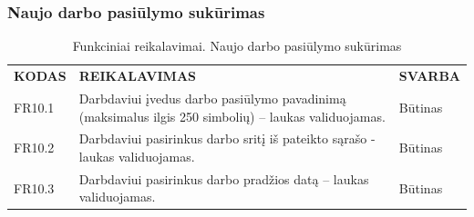 \documentclass{VUMIFPSkursinis}
\begin{document}
\subsubsection{Naujo darbo pasiūlymo sukūrimas}
\begin{table}[H]
\caption{Funkciniai reikalavimai. Naujo darbo pasiūlymo sukūrimas}
\centering
\normalsize
\begin{tabular}{|p{2cm}|p{10cm}|p{3cm}|}
\hline
\rowcolor{gray!30}
\multicolumn{3}{|l|}{\textbf{10. Naujo darbo pasiūlymo sukūrimas}} \\ \hline
\textbf{KODAS}& \multicolumn{1}{m{10cm}|}{\textbf{REIKALAVIMAS}} & \textbf{SVARBA} \\ \hline
FR10.1 & \multicolumn{1}{m{10cm}|}{Darbdaviui įvedus darbo pasiūlymo pavadinimą (maksimalus ilgis 250 simbolių) – laukas validuojamas.} & Būtinas \\ \hline
FR10.2 & \multicolumn{1}{m{10cm}|}{Darbdaviui pasirinkus darbo sritį iš pateikto sąrašo - laukas validuojamas.} & Būtinas \\ \hline
FR10.3 & \multicolumn{1}{m{10cm}|}{Darbdaviui pasirinkus darbo pradžios datą – laukas validuojamas.} & Būtinas \\ \hline

\end{tabular}
\end{table}
\end{document}
